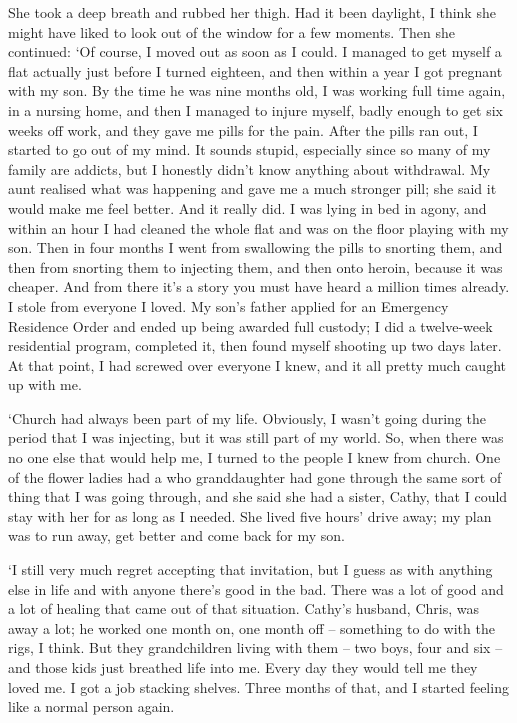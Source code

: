 She took a deep breath and rubbed her thigh. Had it been daylight, I think she might have liked to look out of the window for a few moments. Then she continued: `Of course, I moved out as soon as I could. I managed to get myself a flat actually just before I turned eighteen, and then within a year I got pregnant with my son. By the time he was nine months old, I was working full time again, in a nursing home, and then I managed to injure myself, badly enough to get six weeks off work, and they gave me pills for the pain. After the pills ran out, I started to go out of my mind. It sounds stupid, especially since so many of my family are addicts, but I honestly didn't know anything about withdrawal. My aunt realised what was happening and gave me a much stronger pill; she said it would make me feel better. And it really did. I was lying in bed in agony, and within an hour I had cleaned the whole flat and was on the floor playing with my son. Then in four months I went from swallowing the pills to snorting them, and then from snorting them to injecting them, and then onto heroin, because it was cheaper. And from there it's a story you must have heard a million times already. I stole from everyone I loved. My son's father applied for an Emergency Residence Order and ended up being awarded full custody; I did a twelve-week residential program, completed it, then found myself shooting up two days later. At that point, I had screwed over everyone I knew, and it all pretty much caught up with me.

`Church had always been part of my life. Obviously, I wasn't going during the period that I was injecting, but it was still part of my world. So, when there was no one else that would help me, I turned to the people I knew from church. One of the flower ladies had a who granddaughter had gone through the same sort of thing that I was going through, and she said she had a sister, Cathy, that I could stay with her for as long as I needed. She lived five hours' drive away; my plan was to run away, get better and come back for my son.

`I still very much regret accepting that invitation, but I guess as with anything else in life and with anyone there's good in the bad. There was a lot of good and a lot of healing that came out of that situation. Cathy's husband, Chris, was away a lot; he worked one month on, one month off -- something to do with the rigs, I think. But they grandchildren living with them -- two boys, four and six -- and those kids just breathed life into me. Every day they would tell me they loved me. I got a job stacking shelves. Three months of that, and I started feeling like a normal person again.

